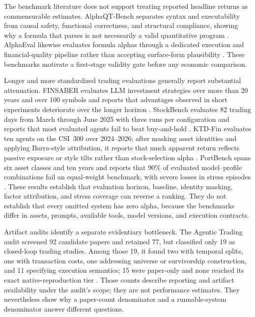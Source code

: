 The benchmark literature does not support treating reported headline returns
as commensurable estimates.  AlphaQT-Bench separates syntax and executability
from causal safety, functional correctness, and structural compliance,
showing why a formula that parses is not necessarily a valid quantitative
program \citep{LuoEtAl2026AlphaQT}.  AlphaEval likewise evaluates formula
alphas through a dedicated execution and financial-quality pipeline rather
than accepting surface-form plausibility \citep{ding2025alphaeval}.  These
benchmarks motivate a first-stage validity gate before any economic comparison.

Longer and more standardized trading evaluations generally report substantial
attenuation.  FINSABER evaluates LLM investment strategies over more than 20
years and over 100 symbols and reports that advantages observed in short
experiments deteriorate over the longer horizon \citep{LiEtAl2026FINSABER}.
StockBench evaluates 82 trading days from March through June 2025 with three
runs per configuration and reports that most evaluated agents fail to beat
buy-and-hold \citep{ChenEtAl2025StockBench}.  KTD-Fin evaluates ten agents on the
CSI~300 over 2024--2026; after masking asset identities and applying Barra-style
attribution, it reports that much apparent return reflects passive exposure or
style tilts rather than stock-selection alpha \citep{ZhuEtAl2026KTDFin}.  PortBench
spans six asset classes and ten years and reports that 90\% of evaluated
model--profile combinations fail an equal-weight benchmark, with severe losses
in stress episodes \citep{ZhaoChenSu2026PortBench}.  These results establish that
evaluation horizon, baseline, identity masking, factor attribution, and stress
coverage can reverse a ranking.  They do not establish that every omitted
system has zero alpha, because the benchmarks differ in assets, prompts,
available tools, model versions, and execution contracts.

Artifact audits identify a separate evidentiary bottleneck.  The Agentic
Trading audit screened 92 candidate papers and retained 77, but classified only
19 as closed-loop trading studies.  Among those 19, it found two with temporal
splits, one with transaction costs, one addressing universe or survivorship
construction, and 11 specifying execution semantics; 15 were paper-only and
none reached its exact native-reproduction tier \citep{XiaEtAl2026AgenticTrading}.
Those counts describe reporting and artifact availability under the audit's
scope; they are not performance estimates.  They nevertheless show why a
paper-count denominator and a runnable-system denominator answer different
questions.

